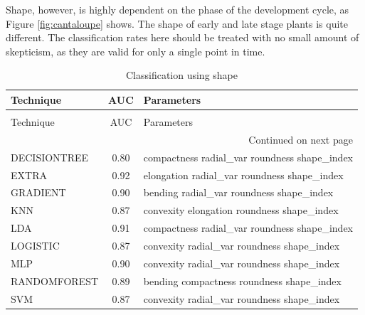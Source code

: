 \documentclass[letterpaper]{article}
\begin{document}
{Shape, however, is highly dependent on the phase of the development cycle, as Figure \ref{fig:cantaloupe} shows. The shape of early and late stage plants is quite different. The classification rates here should be treated with no small amount of skepticism, as they are valid for only a single point in time.

{
\renewcommand{\arraystretch}{0.9}

\begin{longtable}{lcl}
\caption[Classification using shape]{Classification using shape}
\label{table:shape}\\
\toprule
Technique &  AUC &                                   Parameters \\
\midrule
\endfirsthead
\caption[]{Classification using shape} \\
\toprule
Technique &  AUC &                                   Parameters \\
\midrule
\endhead
\midrule
\multicolumn{3}{r}{{Continued on next page}} \\
\midrule
\endfoot

\bottomrule
\endlastfoot
DECISIONTREE & 0.80 & compactness radial\_var roundness shape\_index \\
       EXTRA & 0.92 &  elongation radial\_var roundness shape\_index \\
    GRADIENT & 0.90 &     bending radial\_var roundness shape\_index \\
         KNN & 0.87 &   convexity elongation roundness shape\_index \\
         LDA & 0.91 & compactness radial\_var roundness shape\_index \\
    LOGISTIC & 0.87 &   convexity radial\_var roundness shape\_index \\
         MLP & 0.90 &   convexity radial\_var roundness shape\_index \\
RANDOMFOREST & 0.89 &    bending compactness roundness shape\_index \\
         SVM & 0.87 &   convexity radial\_var roundness shape\_index \\
\end{longtable}

}

}
\end{document}
